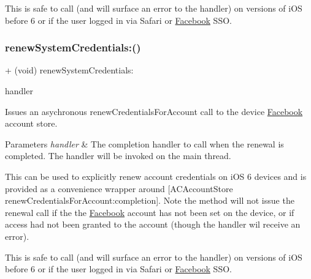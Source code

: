 This is safe to call (and will surface an error to the handler) on versions of i\+OS before 6 or if the user logged in via Safari or \hyperlink{interfaceFacebook}{Facebook} S\+SO. \mbox{\label{interfaceFBSession_a3b4d7c16af36ea5690d19bf77065dfaf}} 
\subsubsection{\texorpdfstring{renew\+System\+Credentials\+:()}{renewSystemCredentials:()}\hspace{0.1cm}{\footnotesize\ttfamily [4/5]}}
{\footnotesize\ttfamily + (void) renew\+System\+Credentials\+: \begin{DoxyParamCaption}\item[{(F\+B\+Session\+Renew\+System\+Credentials\+Handler)}]{handler }\end{DoxyParamCaption}}

Issues an asychronous renew\+Credentials\+For\+Account call to the device \hyperlink{interfaceFacebook}{Facebook} account store.


\begin{DoxyParams}{Parameters}
{\em handler} & The completion handler to call when the renewal is completed. The handler will be invoked on the main thread.\\
\hline
\end{DoxyParams}
This can be used to explicitly renew account credentials on i\+OS 6 devices and is provided as a convenience wrapper around {\ttfamily \mbox{[}A\+C\+Account\+Store renew\+Credentials\+For\+Account\+:completion\mbox{]}}. Note the method will not issue the renewal call if the the \hyperlink{interfaceFacebook}{Facebook} account has not been set on the device, or if access had not been granted to the account (though the handler wil receive an error).

This is safe to call (and will surface an error to the handler) on versions of i\+OS before 6 or if the user logged in via Safari or \hyperlink{interfaceFacebook}{Facebook} S\+SO. \mbox{\label{interfaceFBSession_a3b4d7c16af36ea5690d19bf77065dfaf}} 
